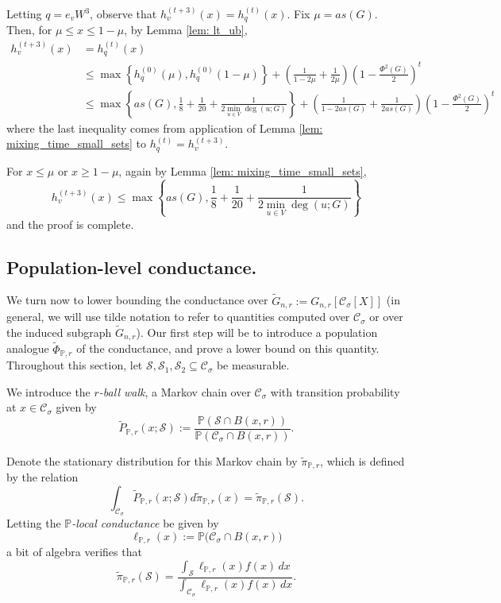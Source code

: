 \documentclass[11pt,twoside]{article}
\newcommand{\set}[1]{\left\{#1\right\}}
\newcommand{\1}{\mathbf{1}}
\newcommand{\Xbf}{X}             %
\newcommand{\Pbb}{\mathbb{P}}
\newcommand{\Sset}{\mathcal{S}}
\newcommand{\Cset}{\mathcal{C}}
\newcommand{\Csig}{\Cset_{\sigma}}
\newcommand{\dx}{\,dx}
\newcommand{\piwt}{\widetilde{\pi}}
\begin{document}
Letting $q = e_v W^3$, observe that $h_v^{(t + 3)}(x) = h_q^{(t)}(x)$. Fix $\mu = as(G)$. Then, for $\mu \leq x \leq 1 - \mu$, by Lemma \ref{lem: lt_ub},
\begin{align*}
h_v^{(t + 3)}(x) & = h_q^{(t)}(x) \\
& \leq \max \set{h_q^{(0)}(\mu), h_q^{(0)}(1 - \mu) }  + \left(\frac{1}{1 - 2 \mu} + \frac{1}{2\mu}\right) \left(1 - \frac{\Phi^2(G)}{2}\right)^t\\
& \leq \max \set{as(G), \frac{1}{8} + \frac{1}{20} + \frac{1}{2 \min_{u \in V} \deg(u;G)}} + \left(\frac{1}{1 - 2a s(G)} + \frac{1}{2 a s(G)}\right) \left(1 - \frac{\Phi^2(G)}{2}\right)^t
\end{align*}
where the last inequality comes from application of Lemma \ref{lem: mixing_time_small_sets} to $h_q^{(t)} = h_v^{(t + 3)}$. 

For $x \leq \mu$ or $x \geq 1 - \mu$, again by Lemma \ref{lem: mixing_time_small_sets},
\begin{equation*}
h_v^{(t + 3)}(x) \leq \max \set{as(G), \frac{1}{8} + \frac{1}{20} + \frac{1}{2 \min_{u \in V} \deg(u;G)}}
\end{equation*}
and the proof is complete. 

\subsection{Population-level conductance.}
\label{sec: population_conductance_function}

We turn now to lower bounding the conductance over $\widetilde{G}_{n,r} := G_{n,r}[\Csig[\Xbf]]$ (in general, we will use tilde notation to refer to quantities computed over $\Csig$ or over the induced subgraph $\widetilde{G}_{n,r}$). Our first step will be to introduce a population analogue $\widetilde{\Phi}_{\Pbb,r}$ of the conductance, and prove a lower bound on this quantity. Throughout this section, let $\Sset, \Sset_1, \Sset_2 \subseteq \Csig$ be measurable.

We introduce the \emph{$r$-ball walk}, a Markov chain over $\Csig$ with transition probability at $x \in \Csig$ given by 
\begin{equation*}
\widetilde{P}_{\Pbb,r}(x; \Sset) := \frac{\Pbb(\Sset \cap B(x,r))}{\Pbb(\Csig \cap B(x,r))}.
\end{equation*}

Denote the stationary distribution for this Markov chain by $\piwt_{\Pbb,r}$, which is defined by the relation
\begin{equation*}
\int_{\Csig} \widetilde{P}_{\Pbb,r}(x; \Sset) d\piwt_{\Pbb,r}(x) = \piwt_{\Pbb,r}(\Sset).
\end{equation*}
Letting the \emph{$\Pbb$-local conductance} be given by
\begin{equation*}
\ell_{\Pbb,r}(x) := \Pbb\bigl(\Csig \cap B(x,r)\bigr)
\end{equation*}
a bit of algebra verifies that
\begin{equation*}
\piwt_{\Pbb,r}(\Sset) = \frac{\int_{\Sset} \ell_{\Pbb,r}(x) f(x) \dx}{\int_{\Csig} \ell_{\Pbb,r}(x) f(x) \dx}.
\end{equation*}
\end{document}
